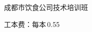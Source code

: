 \documentclass{cookbook}
\begin{document}
\vspace*{\fill}

\begin{flushright}
\footnotesize%
\doublespacing
{%
	\hefamily%
	成都市饮食公司技术培训班
}

工本费：每本\,0.55%
\mbox{\hspace{1.8em}}
\end{flushright}
\end{document}
